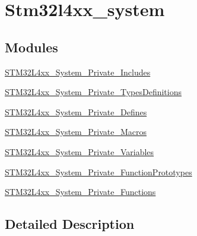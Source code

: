 \hypertarget{group__stm32l4xx__system}{}\section{Stm32l4xx\+\_\+system}
\label{group__stm32l4xx__system}
\subsection*{Modules}
\begin{DoxyCompactItemize}
\item 
\mbox{\hyperlink{group___s_t_m32_l4xx___system___private___includes}{S\+T\+M32\+L4xx\+\_\+\+System\+\_\+\+Private\+\_\+\+Includes}}
\item 
\mbox{\hyperlink{group___s_t_m32_l4xx___system___private___types_definitions}{S\+T\+M32\+L4xx\+\_\+\+System\+\_\+\+Private\+\_\+\+Types\+Definitions}}
\item 
\mbox{\hyperlink{group___s_t_m32_l4xx___system___private___defines}{S\+T\+M32\+L4xx\+\_\+\+System\+\_\+\+Private\+\_\+\+Defines}}
\item 
\mbox{\hyperlink{group___s_t_m32_l4xx___system___private___macros}{S\+T\+M32\+L4xx\+\_\+\+System\+\_\+\+Private\+\_\+\+Macros}}
\item 
\mbox{\hyperlink{group___s_t_m32_l4xx___system___private___variables}{S\+T\+M32\+L4xx\+\_\+\+System\+\_\+\+Private\+\_\+\+Variables}}
\item 
\mbox{\hyperlink{group___s_t_m32_l4xx___system___private___function_prototypes}{S\+T\+M32\+L4xx\+\_\+\+System\+\_\+\+Private\+\_\+\+Function\+Prototypes}}
\item 
\mbox{\hyperlink{group___s_t_m32_l4xx___system___private___functions}{S\+T\+M32\+L4xx\+\_\+\+System\+\_\+\+Private\+\_\+\+Functions}}
\end{DoxyCompactItemize}


\subsection{Detailed Description}

